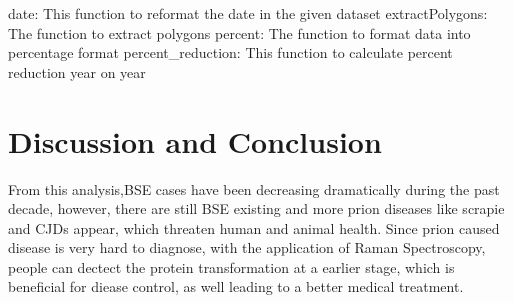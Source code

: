 \documentclass{article}\usepackage[]{graphicx}\usepackage[]{color}
\begin{document}
date: This function to reformat the date in the given dataset
extractPolygons: The function to extract polygons
percent: The function to format data into percentage format
percent_reduction: This function to calculate percent reduction year on year
                        
\section{Discussion and Conclusion}

From this analysis,BSE cases have been decreasing dramatically during the past decade, however, there are still BSE existing and more prion diseases like scrapie and CJDs appear, which threaten human and animal health. Since prion caused disease is very hard to diagnose, with the application of Raman Spectroscopy, people can dectect the protein transformation at a earlier stage, which is beneficial for diease control, as well leading to a better medical treatment.
\end{document}
